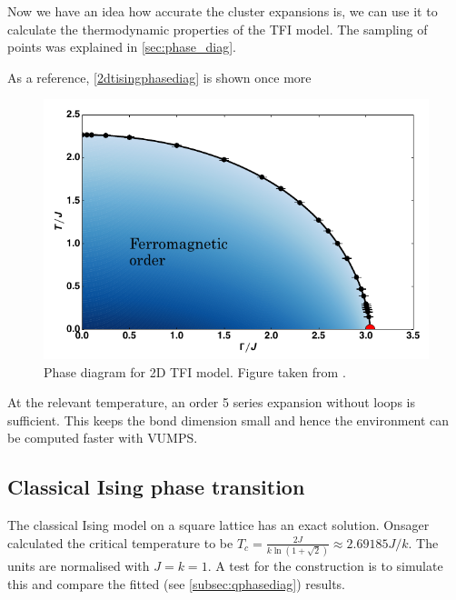 
Now we have an idea how accurate the cluster expansions is, we can use it to calculate the thermodynamic properties of the \Gls{TFI} model. The sampling of points was explained in \cref{sec:phase_diag}.

As a reference, \cref{2dtisingphasediag} is shown once more

\begin{figure}[!htbp]
    \center
    \includegraphics[width=\textwidth]{Figuren/phsyics/2disingphase.png}
    \caption{Phase diagram for 2D \Gls{TFI} model. Figure taken from \cite{Hesselmann2016}.}
    \label{2dtisingphasediag2}
\end{figure}

At the relevant temperature, an order 5 series expansion without loops is sufficient. This keeps the bond dimension small and hence the environment can be computed faster with \Gls{VUMPS}.

\subsection{Classical Ising phase transition}
The classical Ising model on a square lattice has an exact solution. Onsager calculated the critical temperature to be $T_c = \frac{2 J}{k \ln(1+\sqrt{2}) } \approx 2.69185 J/k$.  The units are normalised with $J=k=1$. A test for the construction is to simulate this and compare the fitted (see \cref{subsec:qphasediag}) results.

